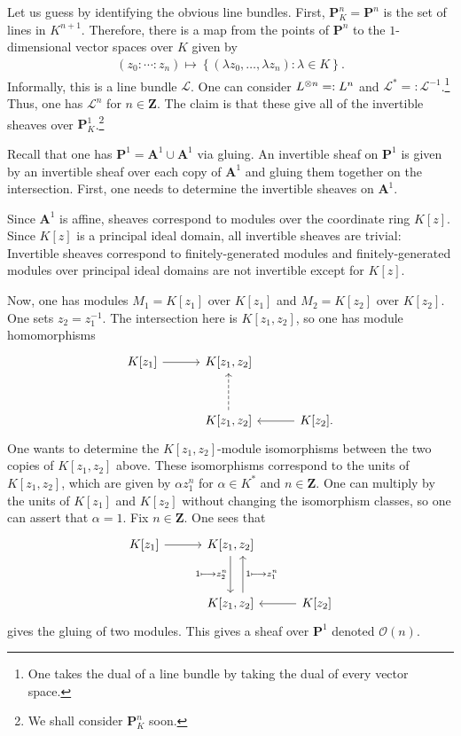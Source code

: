 \documentclass [11 pt, oneside] {article}
\begin{document}
Let us guess by identifying the obvious line bundles. First, $\mathbf{P}^n_K =\mathbf{P}^n$ is the set of lines in $K^{n+1}$. Therefore, there is a map from the points of $\mathbf{P}^n$ to the $1$-dimensional vector spaces over $K$ given by
\begin{align*}
	(z_0:\cdots :z_n)\longmapsto \left\{ (\lambda z_0,\hdots,\lambda z_n):\lambda \in K \right\}. 
\end{align*}
Informally, this is a line bundle $\mathscr{L}$. One can consider $\relax{L}^{\otimes n} =: \relax{L}^n$ and $\mathscr{L}^* =: \mathscr{L}^{-1}$.\footnote{One takes the dual of a line bundle by taking the dual of every vector space.} Thus, one has $\mathscr{L}^n$ for $n\in\mathbf{Z}$. The claim is that these give all of the invertible sheaves over $\mathbf{P}^1_K$.\footnote{We shall consider $\mathbf{P}^n_K$ soon.}

Recall that one has $\mathbf{P}^1 = \mathbf{A}^1\cup \mathbf{A}^1$ via gluing. An invertible sheaf on $\mathbf{P}^1$ is given by an invertible sheaf over each copy of $\mathbf{A}^1$ and gluing them together on the intersection. First, one needs to determine the invertible sheaves on $\mathbf{A}^1$.

Since $\mathbf{A}^1$ is affine, sheaves correspond to modules over the coordinate ring $K[z]$. Since $K[z]$ is a principal ideal domain, all invertible sheaves are trivial: Invertible sheaves correspond to finitely-generated modules and finitely-generated modules over principal ideal domains are not invertible except for $K[z]$.

Now, one has modules $M_1=K[z_1]$ over $K[z_1]$ and $M_2 = K[z_2]$ over $K[z_2]$. One sets $z_2=z_1^{-1}$. The intersection here is $K[z_1,z_2]$, so one has module homomorphisms
\[
\begin{tikzcd}[sep = 3 em]
	K[z_1] \ar[r] & K[z_1,z_2]\\
		      &K[z_1,z_2]\ar[u,dashed]&K[z_2].\ar[l]
\end{tikzcd}
\]
One wants to determine the $K[z_1,z_2]$-module isomorphisms between the two copies of $K[z_1,z_2]$ above. These isomorphisms correspond to the units of $K[z_1,z_2]$, which are given by $\alpha z_1^n$ for $\alpha\in K^*$ and $n\in \mathbf{Z}$. One can multiply by the units of $K[z_1]$ and $K[z_2]$ without changing the isomorphism classes, so one can assert that $\alpha = 1$. Fix $n\in \mathbf{Z}$. One sees that
\[
\begin{tikzcd}[sep = 3 em]
	K[z_1]\ar[r]& K[z_1,z_2] \ar[d, "1\longmapsto z_2^n", swap] \\
	&K[z_1,z_2] \ar[u,"1\longmapsto z_1^n",xshift = 1 em, swap] &K[z_2]\ar[l] 
\end{tikzcd}
\]
gives the gluing of two modules. This gives a sheaf over $\mathbf{P}^1$ denoted $\mathscr{O}(n)$.
\end{document}
